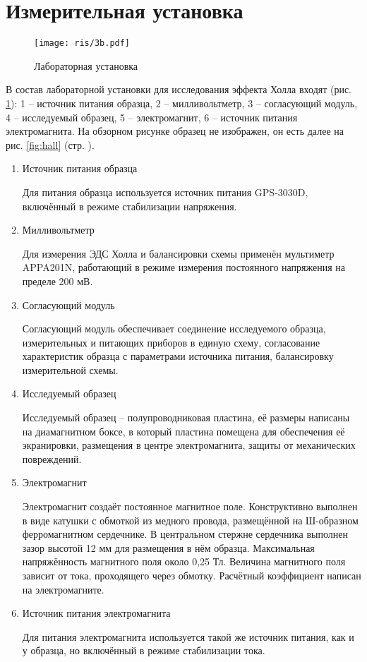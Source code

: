\documentclass[a4paper,14pt]{extarticle}
\begin{document}
\section{Измерительная установка}

\begin{figure}[h!]
	\centering
	\texttt{[image: ris/3b.pdf]}
	\vspace{-0.7em}
	\caption{Лабораторная установка}
	\label{fig:figure1}
\end{figure}

В состав лабораторной установки для исследования эффекта Холла входят (рис. \ref{fig:figure1}): 1 – источник питания образца, 2 – милливольтметр, 3 – согласующий модуль, 4 – исследуемый образец, 5 – электромагнит, 6 – источник питания электромагнита. На обзорном рисунке образец не изображен, он есть далее на рис. \ref{fig:hall} (стр. \pageref{fig:hall}).
\begin{enumerate}
\item Источник питания образца

Для питания образца используется источник питания GPS-3030D, включённый в режиме стабилизации напряжения. 

\item Милливольтметр 

Для измерения ЭДС Холла и балансировки схемы применён мультиметр APPA201N, работающий в режиме измерения постоянного напряжения на пределе 200 мВ. 

\item Согласующий модуль

Согласующий модуль обеспечивает соединение исследуемого образца, измерительных и питающих приборов в единую схему, согласование характеристик образца с параметрами источника питания, балансировку измерительной схемы.

\item Исследуемый образец

Исследуемый образец  -- полупроводниковая пластина, её размеры написаны на диамагнитном боксе, в который пластина помещена для обеспечения её экранировки, размещения в центре электромагнита, защиты от механических повреждений.
\item Электромагнит

Электромагнит создаёт постоянное магнитное поле. Конструктивно выполнен в виде катушки с обмоткой из медного провода, размещённой на Ш-образном ферромагнитном сердечнике. В центральном стержне сердечника выполнен зазор высотой 12 мм для размещения в нём образца. Максимальная напряжённость магнитного поля около 0,25 Тл. Величина магнитного поля зависит от тока, проходящего через обмотку. Расчётный коэффициент написан на электромагните.
\item Источник питания электромагнита

Для питания электромагнита используется такой же источник питания, как и у образца, но включённый в режиме стабилизации тока. 
\end{enumerate}
\end{document}
